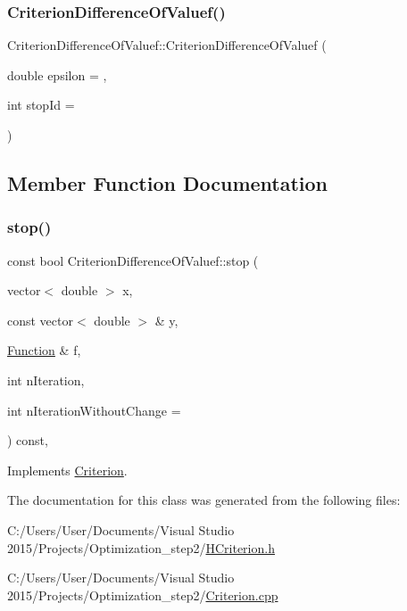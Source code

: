 \subsubsection{\texorpdfstring{Criterion\+Difference\+Of\+Valuef()}{CriterionDifferenceOfValuef()}}
{\footnotesize\ttfamily Criterion\+Difference\+Of\+Valuef\+::\+Criterion\+Difference\+Of\+Valuef (\begin{DoxyParamCaption}\item[{double}]{epsilon = {},  }\item[{int}]{stop\+Id = {} }\end{DoxyParamCaption})\hspace{0.3cm}{\ttfamily [inline]}}



\subsection{Member Function Documentation}
\mbox{\label{class_criterion_difference_of_valuef_afd9664b09456be745efd44d1577d26b1}} 
\subsubsection{\texorpdfstring{stop()}{stop()}}
{\footnotesize\ttfamily const bool Criterion\+Difference\+Of\+Valuef\+::stop (\begin{DoxyParamCaption}\item[{vector$<$ double $>$}]{x,  }\item[{const vector$<$ double $>$ \&}]{y,  }\item[{\hyperlink{class_function}{Function} \&}]{f,  }\item[{int}]{n\+Iteration,  }\item[{int}]{n\+Iteration\+Without\+Change = {} }\end{DoxyParamCaption}) const\hspace{0.3cm}{\ttfamily [override]}, {\ttfamily [virtual]}}



Implements \hyperlink{class_criterion_aee3e2148c665c72c50c2f870a3ca8cdc}{Criterion}.



The documentation for this class was generated from the following files\+:\begin{DoxyCompactItemize}
\item 
C\+:/\+Users/\+User/\+Documents/\+Visual Studio 2015/\+Projects/\+Optimization\+\_\+step2/\hyperlink{_h_criterion_8h}{H\+Criterion.\+h}\item 
C\+:/\+Users/\+User/\+Documents/\+Visual Studio 2015/\+Projects/\+Optimization\+\_\+step2/\hyperlink{_criterion_8cpp}{Criterion.\+cpp}\end{DoxyCompactItemize}
